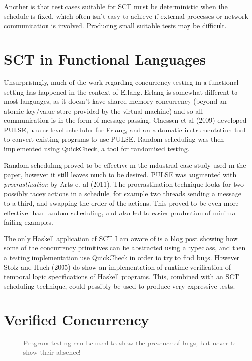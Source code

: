 Another is that test cases suitable for SCT must be deterministic when
the schedule is fixed, which often isn't easy to achieve if external
processes or network communication is involved. Producing small
suitable tests may be difficult.

\section{SCT in Functional Languages}
\label{sec:litrev-sctfunc}

Unsurprisingly, much of the work regarding concurrency testing in a
functional setting has happened in the context of Erlang. Erlang is
somewhat different to most languages, as it doesn't have shared-memory
concurrency (beyond an atomic key/value store provided by the virtual
machine) and so all communication is in the form of
message-passing. Claessen et al (2009)\nocite{pulse} developed PULSE,
a user-level scheduler for Erlang, and an automatic instrumentation
tool to convert existing programs to use PULSE. Random scheduling was
then implemented using QuickCheck, a tool for randomised testing.

Random scheduling proved to be effective in the industrial case study
used in the paper, however it still leaves much to be desired. PULSE
was augmented with \textit{procrastination} by Arts et al (2011). The
procrastination technique looks for two possibly racey actions in a
schedule, for example two threads sending a message to a third, and
swapping the order of the actions. This proved to be even more
effective than random scheduling, and also led to easier production of
minimal failing examples.

The only Haskell application of SCT I am aware of is a blog
post\cite{typeclass} showing how some of the concurrency primitives
can be abstracted using a typeclass, and then a testing implementation
use QuickCheck in order to try to find bugs. However Stolz and Huch
(2005)\nocite{rvhaskell} do show an implementation of runtime
verification of temporal logic specifications of Haskell
programs. This, combined with an SCT scheduling technique, could
possibly be used to produce very expressive tests.

\section{Verified Concurrency}
\label{sec:litref-verify}

\begin{quote}
  Program testing can be used to show the presence of bugs, but never
  to show their absence!\cite{ewd249}
\end{quote}

